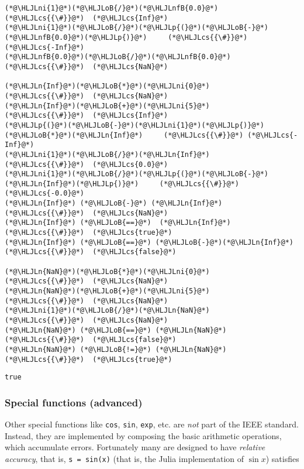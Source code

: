 \documentclass[12pt,a4paper]{article}
\newcommand{\HLJLn}[1]{#1}
\newcommand{\HLJLnfB}[1]{\textcolor[RGB]{59,151,46}{#1}}
\newcommand{\HLJLni}[1]{\textcolor[RGB]{59,151,46}{#1}}
\newcommand{\HLJLoB}[1]{\textcolor[RGB]{102,102,102}{\textbf{#1}}}
\newcommand{\HLJLp}[1]{#1}
\newcommand{\HLJLcs}[1]{\textcolor[RGB]{153,153,119}{\textit{#1}}}
\begin{document}
\begin{lstlisting}
(*@\HLJLni{1}@*)(*@\HLJLoB{/}@*)(*@\HLJLnfB{0.0}@*)        (*@\HLJLcs{{\#}}@*)  (*@\HLJLcs{Inf}@*)
(*@\HLJLni{1}@*)(*@\HLJLoB{/}@*)(*@\HLJLp{(}@*)(*@\HLJLoB{-}@*)(*@\HLJLnfB{0.0}@*)(*@\HLJLp{)}@*)     (*@\HLJLcs{{\#}}@*) (*@\HLJLcs{-Inf}@*)
(*@\HLJLnfB{0.0}@*)(*@\HLJLoB{/}@*)(*@\HLJLnfB{0.0}@*)      (*@\HLJLcs{{\#}}@*)  (*@\HLJLcs{NaN}@*)

(*@\HLJLn{Inf}@*)(*@\HLJLoB{*}@*)(*@\HLJLni{0}@*)        (*@\HLJLcs{{\#}}@*)  (*@\HLJLcs{NaN}@*)
(*@\HLJLn{Inf}@*)(*@\HLJLoB{+}@*)(*@\HLJLni{5}@*)        (*@\HLJLcs{{\#}}@*)  (*@\HLJLcs{Inf}@*)
(*@\HLJLp{(}@*)(*@\HLJLoB{-}@*)(*@\HLJLni{1}@*)(*@\HLJLp{)}@*)(*@\HLJLoB{*}@*)(*@\HLJLn{Inf}@*)     (*@\HLJLcs{{\#}}@*) (*@\HLJLcs{-Inf}@*)
(*@\HLJLni{1}@*)(*@\HLJLoB{/}@*)(*@\HLJLn{Inf}@*)        (*@\HLJLcs{{\#}}@*)  (*@\HLJLcs{0.0}@*)
(*@\HLJLni{1}@*)(*@\HLJLoB{/}@*)(*@\HLJLp{(}@*)(*@\HLJLoB{-}@*)(*@\HLJLn{Inf}@*)(*@\HLJLp{)}@*)     (*@\HLJLcs{{\#}}@*) (*@\HLJLcs{-0.0}@*)
(*@\HLJLn{Inf}@*) (*@\HLJLoB{-}@*) (*@\HLJLn{Inf}@*)    (*@\HLJLcs{{\#}}@*)  (*@\HLJLcs{NaN}@*)
(*@\HLJLn{Inf}@*) (*@\HLJLoB{==}@*)  (*@\HLJLn{Inf}@*)  (*@\HLJLcs{{\#}}@*)  (*@\HLJLcs{true}@*)
(*@\HLJLn{Inf}@*) (*@\HLJLoB{==}@*) (*@\HLJLoB{-}@*)(*@\HLJLn{Inf}@*)  (*@\HLJLcs{{\#}}@*)  (*@\HLJLcs{false}@*)

(*@\HLJLn{NaN}@*)(*@\HLJLoB{*}@*)(*@\HLJLni{0}@*)        (*@\HLJLcs{{\#}}@*)  (*@\HLJLcs{NaN}@*)
(*@\HLJLn{NaN}@*)(*@\HLJLoB{+}@*)(*@\HLJLni{5}@*)        (*@\HLJLcs{{\#}}@*)  (*@\HLJLcs{NaN}@*)
(*@\HLJLni{1}@*)(*@\HLJLoB{/}@*)(*@\HLJLn{NaN}@*)        (*@\HLJLcs{{\#}}@*)  (*@\HLJLcs{NaN}@*)
(*@\HLJLn{NaN}@*) (*@\HLJLoB{==}@*) (*@\HLJLn{NaN}@*)   (*@\HLJLcs{{\#}}@*)  (*@\HLJLcs{false}@*)
(*@\HLJLn{NaN}@*) (*@\HLJLoB{!=}@*) (*@\HLJLn{NaN}@*)   (*@\HLJLcs{{\#}}@*)  (*@\HLJLcs{true}@*)
\end{lstlisting}

\begin{lstlisting}
true
\end{lstlisting}


\subsubsection{Special functions (advanced)}
Other special functions like \texttt{cos}, \texttt{sin}, \texttt{exp}, etc. are \emph{not} part of the IEEE standard. Instead, they are implemented by composing the basic arithmetic operations, which accumulate errors. Fortunately many are  designed to have \emph{relative accuracy}, that is, \texttt{s = sin(x)} (that is, the Julia implementation of $\sin x$) satisfies
\end{document}
